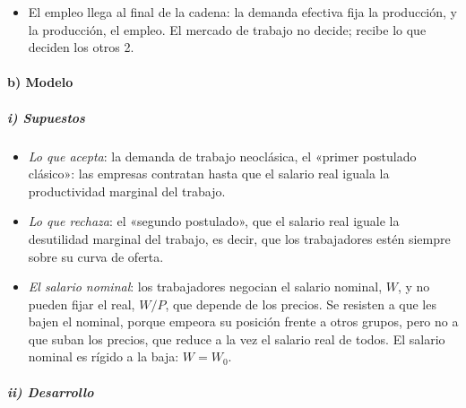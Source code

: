 \documentclass[11pt]{article}
\begin{document}
\begin{itemize}
\item El empleo llega al final de la cadena: la demanda efectiva fija la producción, y la producción, el empleo. El mercado de trabajo no decide; recibe lo que deciden los otros 2.
\end{itemize}

\paragraph{b) Modelo}

\subparagraph{i) Supuestos}

\begin{itemize}
\item \emph{Lo que acepta}: la demanda de trabajo neoclásica, el «primer postulado clásico»: las empresas contratan hasta que el salario real iguala la productividad marginal del trabajo\nocite{Keynes1936}.
\item \emph{Lo que rechaza}: el «segundo postulado», que el salario real iguale la desutilidad marginal del trabajo, es decir, que los trabajadores estén siempre sobre su curva de oferta.
\item \emph{El salario nominal}: los trabajadores negocian el salario nominal, $W$, y no pueden fijar el real, $W/P$, que depende de los precios. Se resisten a que les bajen el nominal, porque empeora su posición frente a otros grupos, pero no a que suban los precios, que reduce a la vez el salario real de todos. El salario nominal es rígido a la baja: $W=W_0$.
\end{itemize}

\subparagraph{ii) Desarrollo}
\end{document}
